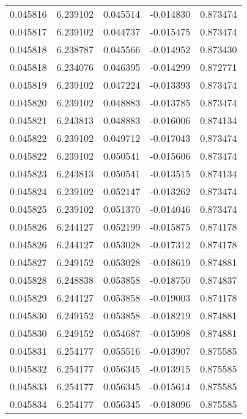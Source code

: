 \begin{tabular}{lrrrr}
0.045816    &  6.239102 &  0.045514 & -0.014830 &             0.873474 \\
0.045817    &  6.239102 &  0.044737 & -0.015475 &             0.873474 \\
0.045818    &  6.238787 &  0.045566 & -0.014952 &             0.873430 \\
0.045818    &  6.234076 &  0.046395 & -0.014299 &             0.872771 \\
0.045819    &  6.239102 &  0.047224 & -0.013393 &             0.873474 \\
0.045820    &  6.239102 &  0.048883 & -0.013785 &             0.873474 \\
0.045821    &  6.243813 &  0.048883 & -0.016006 &             0.874134 \\
0.045822    &  6.239102 &  0.049712 & -0.017043 &             0.873474 \\
0.045822    &  6.239102 &  0.050541 & -0.015606 &             0.873474 \\
0.045823    &  6.243813 &  0.050541 & -0.013515 &             0.874134 \\
0.045824    &  6.239102 &  0.052147 & -0.013262 &             0.873474 \\
0.045825    &  6.239102 &  0.051370 & -0.014046 &             0.873474 \\
0.045826    &  6.244127 &  0.052199 & -0.015875 &             0.874178 \\
0.045826    &  6.244127 &  0.053028 & -0.017312 &             0.874178 \\
0.045827    &  6.249152 &  0.053028 & -0.018619 &             0.874881 \\
0.045828    &  6.248838 &  0.053858 & -0.018750 &             0.874837 \\
0.045829    &  6.244127 &  0.053858 & -0.019003 &             0.874178 \\
0.045830    &  6.249152 &  0.053858 & -0.018219 &             0.874881 \\
0.045830    &  6.249152 &  0.054687 & -0.015998 &             0.874881 \\
0.045831    &  6.254177 &  0.055516 & -0.013907 &             0.875585 \\
0.045832    &  6.254177 &  0.056345 & -0.013915 &             0.875585 \\
0.045833    &  6.254177 &  0.056345 & -0.015614 &             0.875585 \\
0.045834    &  6.254177 &  0.056345 & -0.018096 &             0.875585 \\

\end{tabular}
